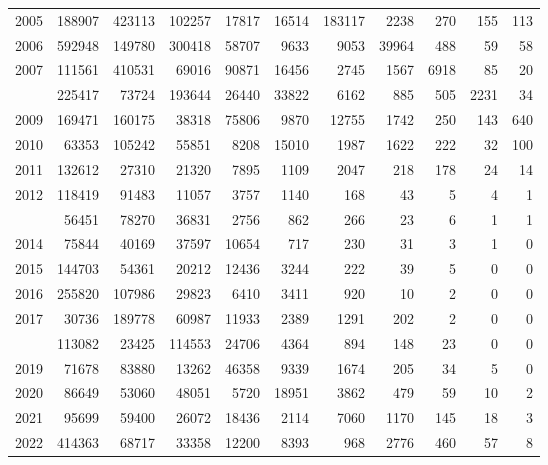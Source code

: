 \documentclass[
]{article}
\begin{document}
\begin{longtable}[t]{lrrrrrrrrrr}
2005 & 188907 & 423113 & 102257 & 17817 & 16514 & 183117 & 2238 & 270 & 155 & 113\\
2006 & 592948 & 149780 & 300418 & 58707 & 9633 & 9053 & 39964 & 488 & 59 & 58\\
2007 & 111561 & 410531 & 69016 & 90871 & 16456 & 2745 & 1567 & 6918 & 85 & 20\\
\addlinespace
2008 & 225417 & 73724 & 193644 & 26440 & 33822 & 6162 & 885 & 505 & 2231 & 34\\
2009 & 169471 & 160175 & 38318 & 75806 & 9870 & 12755 & 1742 & 250 & 143 & 640\\
2010 & 63353 & 105242 & 55851 & 8208 & 15010 & 1987 & 1622 & 222 & 32 & 100\\
2011 & 132612 & 27310 & 21320 & 7895 & 1109 & 2047 & 218 & 178 & 24 & 14\\
2012 & 118419 & 91483 & 11057 & 3757 & 1140 & 168 & 43 & 5 & 4 & 1\\
\addlinespace
2013 & 56451 & 78270 & 36831 & 2756 & 862 & 266 & 23 & 6 & 1 & 1\\
2014 & 75844 & 40169 & 37597 & 10654 & 717 & 230 & 31 & 3 & 1 & 0\\
2015 & 144703 & 54361 & 20212 & 12436 & 3244 & 222 & 39 & 5 & 0 & 0\\
2016 & 255820 & 107986 & 29823 & 6410 & 3411 & 920 & 10 & 2 & 0 & 0\\
2017 & 30736 & 189778 & 60987 & 11933 & 2389 & 1291 & 202 & 2 & 0 & 0\\
\addlinespace
2018 & 113082 & 23425 & 114553 & 24706 & 4364 & 894 & 148 & 23 & 0 & 0\\
2019 & 71678 & 83880 & 13262 & 46358 & 9339 & 1674 & 205 & 34 & 5 & 0\\
2020 & 86649 & 53060 & 48051 & 5720 & 18951 & 3862 & 479 & 59 & 10 & 2\\
2021 & 95699 & 59400 & 26072 & 18436 & 2114 & 7060 & 1170 & 145 & 18 & 3\\
2022 & 414363 & 68717 & 33358 & 12200 & 8393 & 968 & 2776 & 460 & 57 & 8\\*
\end{longtable}
\end{document}
